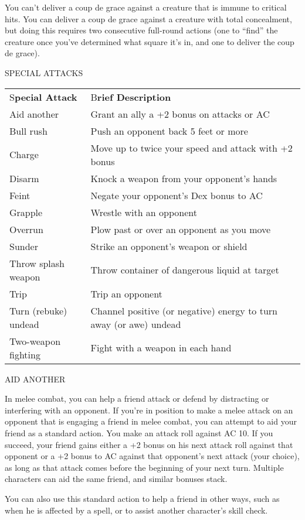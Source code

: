 \documentclass{article}
\begin{document}
You can't deliver a coup de grace against a creature that is immune to critical 
hits. You can deliver a coup de grace against a creature with total concealment, 
but doing this requires two consecutive full-round actions (one to ``find'' the 
creature once you've determined what square it's in, and one to deliver the coup 
de grace).

\vspace{12pt}
{\LARGE{}SPECIAL ATTACKS}

\begin{tabular}{|>{\raggedright}p{79pt}|>{\raggedright}p{246pt}|}
\hline
\multicolumn{2}{|p{326pt}|}{T\textbf{able: Special Attacks}}\tabularnewline
\hline
S\textbf{pecial Attack } & B\textbf{rief Description}\tabularnewline
\hline
Aid another  & Grant an ally a +2 bonus on attacks or AC\tabularnewline
\hline
Bull rush  & Push an opponent back 5 feet or more\tabularnewline
\hline
Charge  & Move up to twice your speed and attack with +2 bonus\tabularnewline
\hline
Disarm  & Knock a weapon from your opponent's hands\tabularnewline
\hline
Feint  & Negate your opponent's Dex bonus to AC\tabularnewline
\hline
Grapple  & Wrestle with an opponent\tabularnewline
\hline
Overrun  & Plow past or over an opponent as you move\tabularnewline
\hline
Sunder  & Strike an opponent's weapon or shield\tabularnewline
\hline
Throw splash weapon  & Throw container of dangerous liquid at target\tabularnewline
\hline
Trip  & Trip an opponent\tabularnewline
\hline
Turn (rebuke) undead  & Channel positive (or negative) energy to turn away (or 
awe) undead\tabularnewline
\hline
Two-weapon fighting  & Fight with a weapon in each hand\tabularnewline
\hline
\end{tabular}

\vspace{12pt}
AID ANOTHER

In melee combat, you can help a friend attack or defend by distracting or interfering 
with an opponent. If you're in position to make a melee attack on an opponent that 
is engaging a friend in melee combat, you can attempt to aid your friend as a standard 
action. You make an attack roll against AC 10. If you succeed, your friend gains 
either a +2 bonus on his next attack roll against that opponent or a +2 bonus to 
AC against that opponent's next attack (your choice), as long as that attack comes 
before the beginning of your next turn. Multiple characters can aid the same friend, 
and similar bonuses stack.

You can also use this standard action to help a friend in other ways, such as when 
he is affected by a spell, or to assist another character's skill check.
\end{document}
